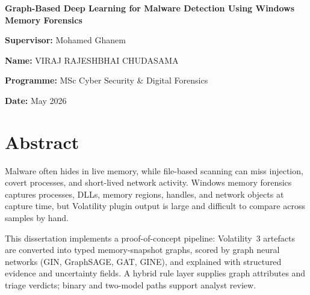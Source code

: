 \begin{titlepage}
\centering
\vspace*{2cm}
{\Large \textbf{Graph-Based Deep Learning for Malware Detection Using Windows Memory Forensics}\par}
\vspace{2cm}
{\large \textbf{Supervisor:} Mohamed Ghanem\par}
\vspace{0.3cm}
{\large \textbf{Name:} VIRAJ RAJESHBHAI CHUDASAMA\par}
\vspace{0.3cm}
{\large \textbf{Programme:} MSc Cyber Security \& Digital Forensics\par}
\vspace{0.3cm}
{\large \textbf{Date:} May 2026\par}
\vfill
\end{titlepage}




\chapter*{Abstract}
Malware often hides in live memory, while file-based scanning can miss injection, covert processes, and short-lived network activity. Windows memory forensics captures processes, DLLs, memory regions, handles, and network objects at capture time, but Volatility plugin output is large and difficult to compare across samples by hand.

This dissertation implements a proof-of-concept pipeline: Volatility~3 artefacts are converted into typed memory-snapshot graphs, scored by graph neural networks (GIN, GraphSAGE, GAT, GINE), and explained with structured evidence and uncertainty fields. A hybrid rule layer supplies graph attributes and triage verdicts; binary and two-model paths support analyst review.

